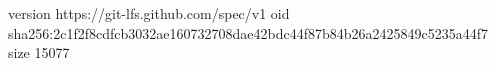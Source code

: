 version https://git-lfs.github.com/spec/v1
oid sha256:2c1f2f8cdfcb3032ae160732708dae42bdc44f87b84b26a2425849c5235a44f7
size 15077
